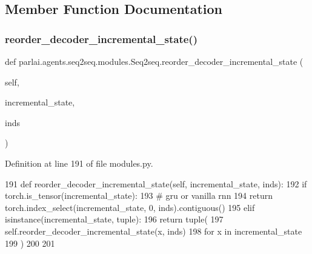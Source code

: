 \subsection{Member Function Documentation}
\mbox{\label{classparlai_1_1agents_1_1seq2seq_1_1modules_1_1Seq2seq_a8503e583661f0d824e0aa070b3d6ff42}} 
\subsubsection{\texorpdfstring{reorder\+\_\+decoder\+\_\+incremental\+\_\+state()}{reorder\_decoder\_incremental\_state()}}
{\footnotesize\ttfamily def parlai.\+agents.\+seq2seq.\+modules.\+Seq2seq.\+reorder\+\_\+decoder\+\_\+incremental\+\_\+state (\begin{DoxyParamCaption}\item[{}]{self,  }\item[{}]{incremental\+\_\+state,  }\item[{}]{inds }\end{DoxyParamCaption})}



Definition at line 191 of file modules.\+py.


\begin{DoxyCode}
191     \textcolor{keyword}{def }reorder\_decoder\_incremental\_state(self, incremental\_state, inds):
192         \textcolor{keywordflow}{if} torch.is\_tensor(incremental\_state):
193             \textcolor{comment}{# gru or vanilla rnn}
194             \textcolor{keywordflow}{return} torch.index\_select(incremental\_state, 0, inds).contiguous()
195         \textcolor{keywordflow}{elif} isinstance(incremental\_state, tuple):
196             \textcolor{keywordflow}{return} tuple(
197                 self.reorder\_decoder\_incremental\_state(x, inds)
198                 \textcolor{keywordflow}{for} x \textcolor{keywordflow}{in} incremental\_state
199             )
200 
201 
\end{DoxyCode}
\mbox{\label{classparlai_1_1agents_1_1seq2seq_1_1modules_1_1Seq2seq_a8161e20a5368471c58ec73e74ba35f48}} 
